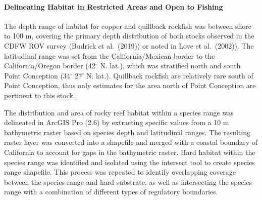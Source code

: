 \documentclass[11pt,
  english,
  letterpaper,
]{article}
\begin{document}

\hypertarget{delineating-habitat-in-restricted-areas-and-open-to-fishing}{%
\paragraph{Delineating Habitat in Restricted Areas and Open to Fishing}\label{delineating-habitat-in-restricted-areas-and-open-to-fishing}}

\leavevmode\tagmcend\tagstructend


The depth range of habitat for copper and quillback rockfish was between shore to 100 m, covering the primary depth distribution of both stocks observed in the CDFW ROV survey (Budrick et al.~{(2019)\leavevmode\tagmcend\tagstructend}) or noted in Love et al.~{(2002)\leavevmode\tagmcend\tagstructend}). The latitudinal range was set from the California/Mexican border to the California/Oregon border (42{\(^\circ\)\leavevmode\tagmcend\tagstructend} N. lat.), which was stratified north and south Point Conception (34{\(^\circ\)\leavevmode\tagmcend\tagstructend} 27' N. lat.). Quillback rockfish are relatively rare south of Point Conception, thus only estimates for the area north of Point Conception are pertinent to this stock.

\leavevmode\tagmcend\tagstructend\par


The distribution and area of rocky reef habitat within a species range was delineated in ArcGIS Pro (2.6) by extracting specific values from a 10 m bathymetric raster based on species depth and latitudinal ranges. The resulting raster layer was converted into a shapefile and merged with a coastal boundary of California to account for gaps in the bathymetric raster. Hard habitat within the species range was identified and isolated using the intersect tool to create species range shapefile. This process was repeated to identify overlapping coverage between the species range and hard substrate, as well as intersecting the species range with a combination of different types of regulatory boundaries.

\leavevmode\tagmcend\tagstructend\par
\end{document}
